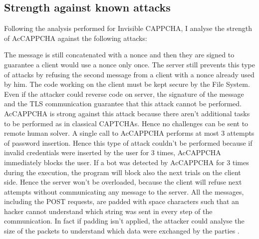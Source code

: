 \subsection{Strength against known attacks}\label{Results:attacks}
Following the analysis performed for Invisible CAPPCHA\cite{Invisible_CAPPCHA}, I analyse the strength of AcCAPPCHA against the following attacks:
\begin{itemize}
{The message is still concatenated with a nonce and then they are signed to guarantee a client would use a nonce only once. The server still prevents this type of attacks by refusing the second message from a client with a nonce already used by him.}
{The code working on the client must be kept secure by the File System. Even if the attacker could reverse code on server, the signature of the message and the TLS communication guarantee that this attack cannot be performed.}
{AcCAPPCHA is strong against this attack because there aren't additional tasks to be performed as in classical CAPTCHAs. Hence no challenges can be sent to remote human solver.}
{A single call to AcCAPPCHA performs at most 3 attempts of password insertion. Hence this type of attack couldn't be performed because if invalid credentials were inserted by the user for 3 times, AcCAPPCHA immediately blocks the user.
}
{If a bot was detected by AcCAPPCHA for 3 times during the execution, the program will block also the next trials on the client side. Hence the server won't be overloaded, because the client will refuse next attempts without communicating any message to the server.}
{All the messages, including the POST requests, are padded with space characters such that an hacker cannot understand which string was sent in every step of the communication. In fact if padding isn't applied, the attacker could analyse the size of the packets to understand which data were exchanged by the parties \cite{side_leaks}.}
\end{itemize}


